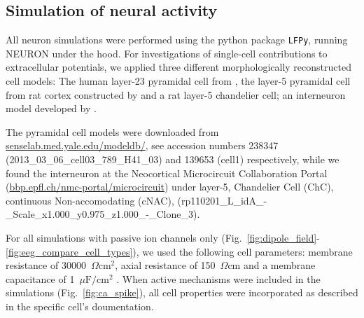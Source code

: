 \documentclass[preprint,10pt,authoryear]{elsarticle}
\newcommand{\hlb}[2][NavyBlue]{ {\sethlcolor{#1} \hl{#2}} }
\newcommand{\hlg}[2][Emerald]{ {\sethlcolor{#1} \hl{#2}} }
\newcommand{\snnote}[1]{\color{white}{\hlb{SN: #1 }}\color{black}}
\newcommand{\sntxt}[1]{{\color{NavyBlue}#1}}
\newcommand{\tvnnote}[1]{\color{white}{\hlg{TVN: #1 }}\color{black}}
\newcommand{\tvntxt}[1]{{\color{Emerald}#1}}
\begin{document}


\subsection{Simulation of neural activity}\label{subsec:simulation}
All neuron simulations were performed using the python package \texttt{LFPy}, running NEURON under the hood. 
For investigations of single-cell contributions to extracellular potentials, we applied three different morphologically reconstructed cell models: The human layer-23 pyramidal cell from \cite{EYAL2018}, the layer-5 pyramidal cell from rat cortex constructed by \cite{HAY2011} and a rat layer-5 chandelier cell; an interneuron model developed by \cite{MARKRAM2015}.

The pyramidal cell models were downloaded from \url{senselab.med.yale.edu/modeldb/}, see accession numbers 238347 \sntxt{(2013\_03\_06\_cell03\_789\_H41\_03)} and 139653 \sntxt{(cell1)} respectively, while we found the interneuron at the Neocortical Microcircuit Collaboration Portal (\url{bbp.epfl.ch/nmc-portal/microcircuit}) under layer-5, Chandelier Cell (ChC), continuous Non-accomodating (cNAC), \sntxt{(rp110201\_L\_idA\_-\_Scale\_x1.000\_y0.975\_z1.000\_-\_Clone\_3)}. %

For all simulations with passive ion channels only \sntxt{(Fig.~\ref{fig:dipole_field}-\ref{fig:eeg_compare_cell_types})}, 
we used the following cell parameters: membrane resistance of 30000~$\Omega \text{cm}^2$, axial resistance of 150~$\Omega \text{cm}$ \citep{MAINEN1996} and a membrane capacitance of 1~$\mu\text{F}/\text{cm}^2$ %
\citep{GENTET2000,STERRATT2011}. When active mechanisms were included in the simulations \sntxt{(Fig.~\ref{fig:ca_spike})}, all cell properties were incorporated as described in the specific cell's doumentation.
\end{document}
